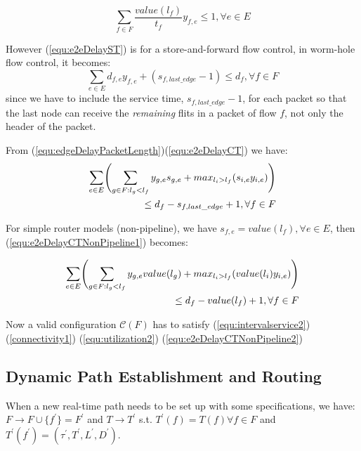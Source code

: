 \documentclass[conference, twocolumn]{IEEEtran}
\theoremstyle{definition}
\begin{document}
\begin{equation}\label{equ:utilization2}
\sum_{f \in F}\frac{value(l_f)}{t_f}y_{f,e} \leq 1, \forall e \in E
\end{equation}

However (\ref{equ:e2eDelayST}) is for a store-and-forward flow control, in
worm-hole flow control, it becomes:
\begin{equation}\label{equ:e2eDelayCT}
\sum_{e \in E}d_{f,e}y_{f,e} + (s_{f,last\_edge} - 1) \leq d_f, \forall f \in F
\end{equation}
since we have to include the service time, $s_{f,last\_edge}-1$, for each
packet so that the last node can receive the {\em remaining} flits in a
packet of flow $f$, not only the header of the packet.


From (\ref{equ:edgeDelayPacketLength})(\ref{equ:e2eDelayCT}) we have:
\begin{eqnarray}\label{equ:e2eDelayCTNonPipeline1}
\sum_{e \in E} \Biggl(\sum_{g \in F:l_g <
l_f}y_{g,e}s_{g,e} +max_{l_i>l_f}(s_{i,e}y_{i,e})\Biggr)\notag \\ \leq
d_f-s_{f,last\_edge} + 1, \forall f \in F
\end{eqnarray}

For simple router models (non-pipeline), we have $s_{f,e} = value(l_f),\forall e
\in E$, then (\ref{equ:e2eDelayCTNonPipeline1}) becomes:

\begin{eqnarray}\label{equ:e2eDelayCTNonPipeline2}
\sum_{e \in E} \Biggl(\sum_{g \in F:l_g <
l_f}y_{g,e}value(l_g) +max_{l_i>l_f}(value(l_i)y_{i,e})\Biggr)\notag \\ \leq
d_f-value(l_f) + 1, \forall f \in F
\end{eqnarray}

Now a valid configuration ${\mathcal C}(F)$ has to satisfy
(\ref{equ:intervalservice2})(\ref{connectivity1}) (\ref{equ:utilization2})
(\ref{equ:e2eDelayCTNonPipeline2})

\subsection{Dynamic Path Establishment and Routing}
When a new real-time path needs to be set up with some specifications, we have:
$F \rightarrow F \cup \{f^{'} \}=F^{'}$
and $T \rightarrow T^{'}$ s.t. $T^{'} (f)=T(f)\forall f \in F$ and $T^{'}
(f^{'})=(\tau ^{'}, T^{'}, L^{'}, D^{'})$.
\end{document}
